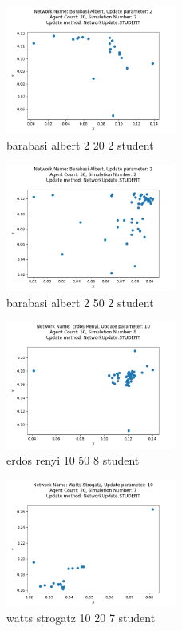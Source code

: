 \documentclass{wfiisul}
\begin{document}
\begin{figure}
  \centering
  \includegraphics[width=0.5\textwidth]{img/barabasi_albert_2_20_2_student.png}
  \caption{barabasi albert 2 20 2 student}
  \label{fig:barabasi_albert_2_20_2_student}
\end{figure}

\begin{figure}
  \centering
  \includegraphics[width=0.5\textwidth]{img/barabasi_albert_2_50_2_student.png}
  \caption{barabasi albert 2 50 2 student}
  \label{fig:barabasi_albert_2_50_2_student}
\end{figure}

\begin{figure}
  \centering
  \includegraphics[width=0.5\textwidth]{img/erdos_renyi_10_50_8_student.png}
  \caption{erdos renyi 10 50 8 student}
  \label{fig:erdos_renyi_10_50_8_student}
\end{figure}

\begin{figure}
  \centering
  \includegraphics[width=0.5\textwidth]{img/watts_strogatz_10_20_7_student.png}
  \caption{watts strogatz 10 20 7 student}
  \label{fig:watts_strogatz_10_20_7_student}
\end{figure}
\end{document}
